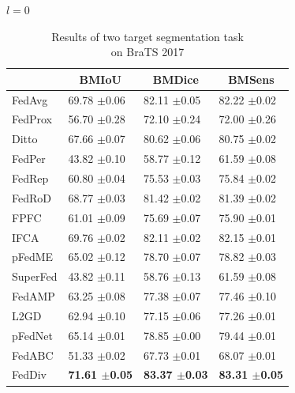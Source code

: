 \documentclass[journal]{IEEEtran}
\begin{document}
\begin{table}
	\caption{Results of two target segmentation task\\ on BraTS 2017} 
	\label{table_Tram2_classification}	
	\centering
	\begin{subtable}[]{$l=0$}
		\begin{tabular}{@{}llll@{}}
			\toprule
			& \multicolumn{1}{c}{BMIoU} & \multicolumn{1}{c}{BMDice} & \multicolumn{1}{c}{BMSens} \\ \midrule
			FedAvg   & 69.78 $\pm$0.06           & 82.11 $\pm$0.05            & 82.22 $\pm$0.02            \\
			FedProx  & 56.70 $\pm$0.28           & 72.10 $\pm$0.24            & 72.00 $\pm$0.26            \\
			Ditto    & 67.66 $\pm$0.07           & 80.62 $\pm$0.06            & 80.75 $\pm$0.02            \\
			FedPer   & 43.82 $\pm$0.10           & 58.77 $\pm$0.12            & 61.59 $\pm$0.08            \\
			FedRep   & 60.80 $\pm$0.04           & 75.53 $\pm$0.03            & 75.84 $\pm$0.02            \\
			FedRoD   & 68.77 $\pm$0.03           & 81.42 $\pm$0.02            & 81.39 $\pm$0.02            \\
			FPFC     & 61.01 $\pm$0.09           & 75.69 $\pm$0.07            & 75.90 $\pm$0.01            \\
			IFCA     & 69.76 $\pm$0.02           & 82.11 $\pm$0.02            & 82.15 $\pm$0.01            \\
			pFedME   & 65.02 $\pm$0.12           & 78.70 $\pm$0.07            & 78.82 $\pm$0.03            \\
			SuperFed & 43.82 $\pm$0.11           & 58.76 $\pm$0.13            & 61.59 $\pm$0.08            \\
			FedAMP   & 63.25 $\pm$0.08           & 77.38 $\pm$0.07            & 77.46 $\pm$0.10            \\
			L2GD   & 62.94 $\pm$0.10           & 77.15 $\pm$0.06            & 77.26 $\pm$0.01            \\
			pFedNet  & 65.14 $\pm$0.01           & 78.85 $\pm$0.00            & 79.44 $\pm$0.01            \\
			FedABC   & 51.33 $\pm$0.02           & 67.73 $\pm$0.01            & 68.07 $\pm$0.01            \\ 
			FedDiv   & \textbf{71.61 $\pm$0.05}  & \textbf{83.37 $\pm$0.03}   & \textbf{83.31 $\pm$0.05}   \\ \bottomrule

\end{tabular}
\end{subtable}
\end{table}
\end{document}
